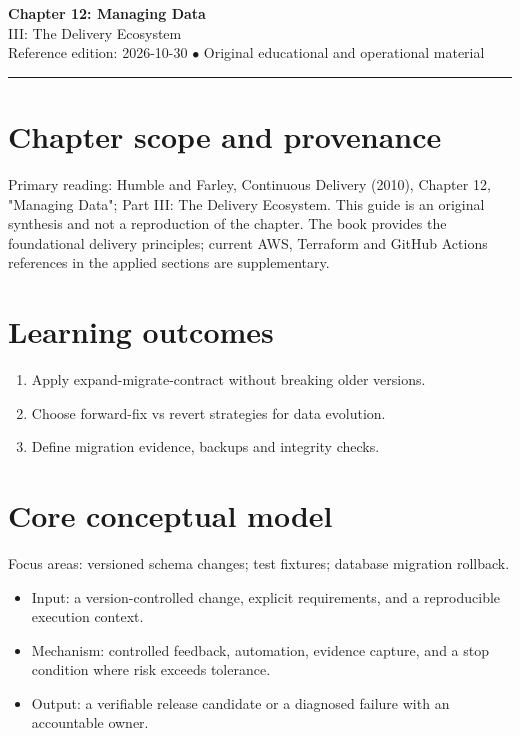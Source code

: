 \documentclass[10pt,letterpaper]{article}
\begin{document}
\begin{center}
{\LARGE\bfseries\color{cdblue}Chapter 12: Managing Data}\\[7pt]
{\large III: The Delivery Ecosystem}\\[6pt]
{\small Reference edition: 2026-10-30 $\bullet$ Original educational and operational material}
\end{center}
\noindent\color{cdblue}\rule{\linewidth}{1.2pt}\color{black}
\vspace{0.4em}
\section{Chapter scope and provenance}
Primary reading: Humble and Farley, Continuous Delivery (2010), Chapter 12, "Managing Data"; Part III: The Delivery Ecosystem. This guide is an original synthesis and not a reproduction of the chapter. The book provides the foundational delivery principles; current AWS, Terraform and GitHub Actions references in the applied sections are supplementary.


\section{Learning outcomes}
\begin{enumerate}
\item Apply expand-migrate-contract without breaking older versions.
\item Choose forward-fix vs revert strategies for data evolution.
\item Define migration evidence, backups and integrity checks.
\end{enumerate}

\section{Core conceptual model}
Focus areas: versioned schema changes; test fixtures; database migration rollback.

\begin{itemize}
\item Input: a version-controlled change, explicit requirements, and a reproducible execution context.
\item Mechanism: controlled feedback, automation, evidence capture, and a stop condition where risk exceeds tolerance.
\item Output: a verifiable release candidate or a diagnosed failure with an accountable owner.
\end{itemize}
\end{document}
